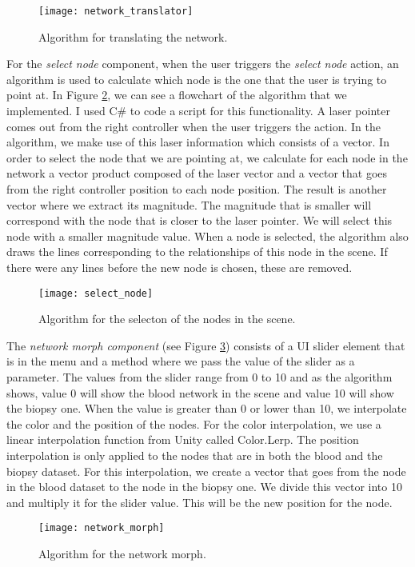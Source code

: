 \begin{figure}[h!]
    \centering%
    \texttt{[image: network\_translator]}
    \caption{Algorithm for translating the network.}
    \label{fig:network_translator}
\end{figure}%

For the \textit{select node} component, when the user triggers the \textit{select node} action, an algorithm is used to calculate which node is the one that the user is trying to point at. In Figure \ref{fig:select_node}, we can see a flowchart of the algorithm that we implemented. I used C\# to code a script for this functionality. A laser pointer comes out from the right controller when the user triggers the action. In the algorithm, we make use of this laser information which consists of a vector. In order to select the node that we are pointing at, we calculate for each node in the network a vector product composed of the laser vector and a vector that goes from the right controller position to each node position. The result is another vector where we extract its magnitude. The magnitude that is smaller will correspond with the node that is closer to the laser pointer. We will select this node with a smaller magnitude value. When a node is selected, the algorithm also draws the lines corresponding to the relationships of this node in the scene. If there were any lines before the new node is chosen, these are removed.
\begin{figure}[h!]
    \centering%
    \texttt{[image: select\_node]}
    \caption{Algorithm for the selecton of the nodes in the scene.}
    \label{fig:select_node}
\end{figure}%

The \textit{network morph component} (see Figure \ref{fig:network_morph}) consists of a UI slider element that is in the menu and a method where we pass the value of the slider as a parameter. The values from the slider range from 0 to 10 and as the algorithm shows, value 0 will show the blood network in the scene and value 10 will show the biopsy one. When the value is greater than 0 or lower than 10, we interpolate the color and the position of the nodes. For the color interpolation, we use a linear interpolation function from Unity called Color.Lerp. The position interpolation is only applied to the nodes that are in both the blood and the biopsy dataset. For this interpolation, we create a vector that goes from the node in the blood dataset to the node in the biopsy one. We divide this vector into 10 and multiply it for the slider value. This will be the new position for the node.
\begin{figure}[h!]
    \centering%
    \texttt{[image: network\_morph]}
    \caption{Algorithm for the network morph.}
    \label{fig:network_morph}
\end{figure}%

